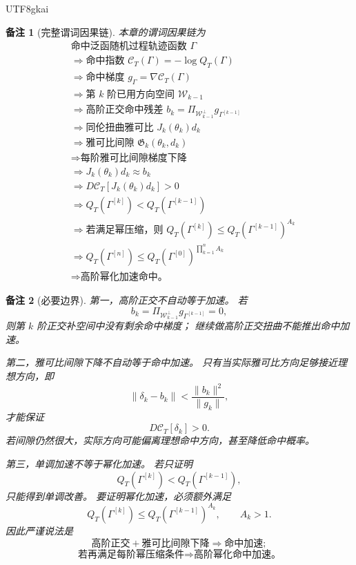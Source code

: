 \documentclass[12pt]{article}
\newtheorem{remark}{备注}[section]
\begin{document}
\begin{CJK*}{UTF8}{gkai}
\begin{remark}[完整谓词因果链]
本章的谓词因果链为
\[
\begin{aligned}
  &\text{命中泛函随机过程轨迹函数 }\Gamma\\
  &\Longrightarrow
  \text{命中指数 }\mathcal C_T(\Gamma)=-\log Q_T(\Gamma)\\
  &\Longrightarrow
  \text{命中梯度 }g_\Gamma=\nabla\mathcal C_T(\Gamma)\\
  &\Longrightarrow
  \text{第 }k\text{ 阶已用方向空间 }\mathcal W_{k-1}\\
  &\Longrightarrow
  \text{高阶正交命中残差 }
  b_k=\Pi_{\mathcal W_{k-1}^{\perp}}g_{\Gamma^{[k-1]}}\\
  &\Longrightarrow
  \text{同伦扭曲雅可比 }J_k(\theta_k)d_k\\
  &\Longrightarrow
  \text{雅可比间隙 }\mathfrak G_k(\theta_k,d_k)\\
  &\Longrightarrow
  \text{每阶雅可比间隙梯度下降}\\
  &\Longrightarrow
  J_k(\theta_k)d_k\approx b_k\\
  &\Longrightarrow
  D\mathcal C_T[J_k(\theta_k)d_k]>0\\
  &\Longrightarrow
  Q_T(\Gamma^{[k]})<Q_T(\Gamma^{[k-1]})\\
  &\Longrightarrow
  \text{若满足幂压缩，则 }
  Q_T(\Gamma^{[k]})
  \le
  Q_T(\Gamma^{[k-1]})^{A_k}\\
  &\Longrightarrow
  Q_T(\Gamma^{[n]})
  \le
  Q_T(\Gamma^{[0]})^{\prod_{k=1}^{n}A_k}\\
  &\Longrightarrow
  \text{高阶幂化加速命中。}
\end{aligned}
\]
\end{remark}

\begin{remark}[必要边界]
第一，高阶正交不自动等于加速。
若
\[
  b_k=
  \Pi_{\mathcal W_{k-1}^{\perp}}g_{\Gamma^{[k-1]}}
  =
  0,
\]
则第 \(k\) 阶正交补空间中没有剩余命中梯度；
继续做高阶正交扭曲不能推出命中加速。

第二，雅可比间隙下降不自动等于命中加速。
只有当实际雅可比方向足够接近理想方向，即
\[
  \lVert\delta_k-b_k\rVert
  <
  \frac{\lVert b_k\rVert^2}{\lVert g_k\rVert},
\]
才能保证
\[
  D\mathcal C_T[\delta_k]>0.
\]
若间隙仍然很大，实际方向可能偏离理想命中方向，甚至降低命中概率。

第三，单调加速不等于幂化加速。
若只证明
\[
  Q_T(\Gamma^{[k]})<Q_T(\Gamma^{[k-1]}),
\]
只能得到单调改善。
要证明幂化加速，必须额外满足
\[
  Q_T(\Gamma^{[k]})
  \le
  Q_T(\Gamma^{[k-1]})^{A_k},
  \qquad A_k>1.
\]
因此严谨说法是
\[
  \boxed{
  \text{高阶正交}
  +
  \text{雅可比间隙下降}
  \Longrightarrow
  \text{命中加速};
  }
\]
\[
  \boxed{
  \text{若再满足每阶幂压缩条件}
  \Longrightarrow
  \text{高阶幂化命中加速。}
  }
\]
\end{remark}


\end{CJK*}
\end{document}
